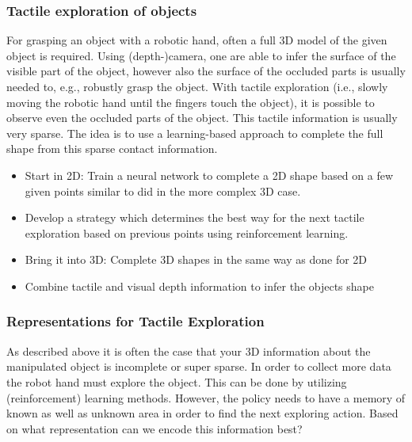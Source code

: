 \documentclass[a4paper]{article}
\begin{document}
\subsubsection{Tactile exploration of objects}

For grasping an object with a robotic hand, often a full 3D model of the given object is required.
Using (depth-)camera, one are able to infer the surface of the visible part of the object, however also the surface of the occluded parts is usually needed to, e.g., robustly grasp the object.
With tactile exploration (i.e., slowly moving the robotic hand until the fingers touch the object), it is possible to observe even the occluded parts of the object.
This tactile information is usually very sparse. The idea is to use a learning-based approach to complete the full shape from this sparse contact information.

\begin{itemize}
  \item Start in 2D: Train a neural network to complete a 2D shape based on a few given points similar to \citet{watkins2019multi} did in the more complex 3D case.
  \item Develop a strategy which determines the best way for the next tactile exploration based on previous points using reinforcement learning.
  \item Bring it into 3D: Complete 3D shapes in the same way as done for 2D
  \item Combine tactile and visual depth information to infer the objects shape
\end{itemize}

\subsubsection{Representations for Tactile Exploration}

As described above it is often the case that your 3D information about the manipulated object is incomplete or super sparse.
In order to collect more data the robot hand must explore the object.
This can be done by utilizing (reinforcement) learning methods.
However, the policy needs to have a memory of known as well as unknown area in order to find the next exploring action.
Based on what representation can we encode this information best?
\end{document}
